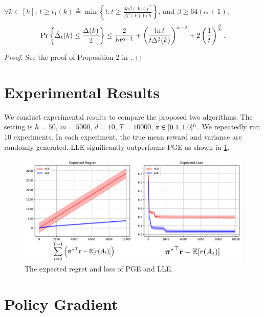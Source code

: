 \begin{lem}
	\label{lem:delta_estimation_lower_bound}
	$\forall k \in [h]$, $t \ge t_1(k) \triangleq \min{\left\{ t : t \ge \frac{4 h \beta \left(\ln{t}\right)^2}{\Delta^4(k) \ln{h}} \right\}}$, and $\beta \ge 64 (\alpha +1)$,
	\begin{equation*}
	{\text{Pr}}\left\{ \hat{\Delta}_t(k) \le \frac{\Delta(k)}{2} \right\} \le \frac{2}{ h t^{\alpha-1}} + \left( \frac{\ln{t}}{t \Delta^2(k)} \right)^{\alpha - 2} + 2 \left(\frac{1}{t}\right)^{\frac{\beta}{8}}.
	\end{equation*}
\end{lem}
\begin{proof}
    See the proof of Proposition 2 in \citep{seldin2017improved}.
\end{proof}

\section{Experimental Results}

We conduct experimental results to compare the proposed two algorithms. The setting is $h = 50$, $m = 5000$, $d = 10$, $T = 10000$, ${\mathbf{r}} \in [0.1, 1.0]^h$. We repeatedly run $10$ experiments. In each experiment, the true mean reward and variance are randomly generated. LLE significantly outperforms PGE as shown in \cref{fig:regret}.

\begin{figure}[h]
	\begin{center}
		\centerline{\includegraphics[width=0.8\columnwidth]{comparison_PGE_LLE.pdf}}
		\caption{The expected regret and loss of PGE and LLE.}
		\label{fig:regret}
	\end{center}
	\vskip -0.2in
\end{figure}


\iffalse

\section{Policy Gradient}

